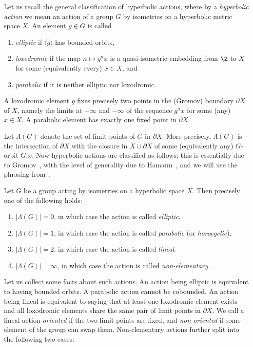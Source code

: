 Let us recall the general classification of hyperbolic actions, where by a \emph{hyperbolic action} we mean an action of a group $G$ by isometries on a hyperbolic metric space $X$. An element $g\in G$ is called \begin{enumerate}
    \item \emph{elliptic} if $\langle g\rangle$ has bounded orbits, \item \emph{loxodromic} if the map $n\mapsto g^n x$ is a quasi-isometric embedding from $\Z$ to $X$ for some (equivalently every) $x\in X$, and 
    \item \emph{parabolic} if it is neither elliptic nor loxodromic. 
    \end{enumerate}
    A loxodromic element $g$ fixes precisely two points in the (Gromov) boundary $\partial X$ of $X$, namely the limits at $+\infty$ and $-\infty$ of the sequence $g^n x$ for some (any) $x\in X$. A parabolic element has exactly one fixed point in $\partial X$. 

Let $\Lambda(G)$ denote the set of limit points of $G$ in $\partial X$. More precisely, $\Lambda(G)$ is the intersection of $\partial X$ with the closure in $X\cup\partial X$ of some (equivalently any) $G$-orbit $G.x$. Now hyperbolic actions are classified as follows; this is essentially due to Gromov~\cite[Section~8.2]{gromov87}, with the level of generality due to Hamann~\cite{hamann17}, and we will use the phrasing from~\cite[Theorem~2.7]{confining}.

\begin{cit}
Let $G$ be a group acting by isometries on a hyperbolic space $X$. Then precisely one of the following holds:
\begin{enumerate}
    \item $|\Lambda(G)|=0$, in which case the action is called \emph{elliptic}.
    \item $|\Lambda(G)|=1$, in which case the action is called \emph{parabolic} (or \emph{horocyclic}).
    \item $|\Lambda(G)|=2$, in which case the action is called \emph{lineal}.
    \item $|\Lambda(G)|=\infty$, in which case the action is called \emph{non-elementary}.
\end{enumerate}
\end{cit}

Let us collect some facts about such actions. An action being elliptic is equivalent to having bounded orbits. A parabolic action cannot be cobounded. An action being lineal is equivalent to saying that at least one loxodromic element exists and all loxodromic elements share the same pair of limit points in $\partial X$. We call a lineal action \emph{oriented} if the two limit points are fixed, and \emph{non-oriented} if some element of the group can swap them. Non-elementary actions further split into the following two cases:


